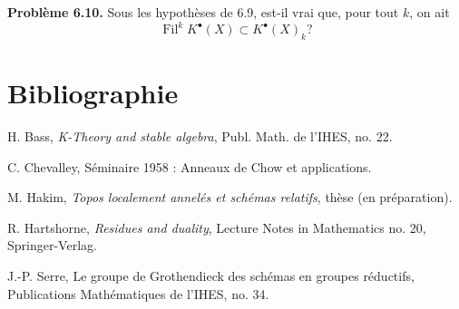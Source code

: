 \documentclass[11pt]{article}
\newcommand{\Fil}{\operatorname{Fil}}
\begin{document}
\textbf{Problème 6.10.} Sous les hypothèses de 6.9, est-il vrai que, pour tout \(k\), on ait
\[
  \Fil^kK^\bullet(X)\subset K^\bullet(X)_k?
\]

\section*{Bibliographie}
\begin{enumerate}[label={[\arabic*]}]
\item H. Bass, \emph{K-Theory and stable algebra}, Publ. Math. de l'IHES, no. 22.
\item C. Chevalley, Séminaire 1958 : Anneaux de Chow et applications.
\item M. Hakim, \emph{Topos localement annelés et schémas relatifs}, thèse (en préparation).
\item R. Hartshorne, \emph{Residues and duality}, Lecture Notes in Mathematics no. 20, Springer-Verlag.
\item J.-P. Serre, Le groupe de Grothendieck des schémas en groupes réductifs, Publications Mathématiques de l'IHES, no. 34.
\end{enumerate}
\end{document}
